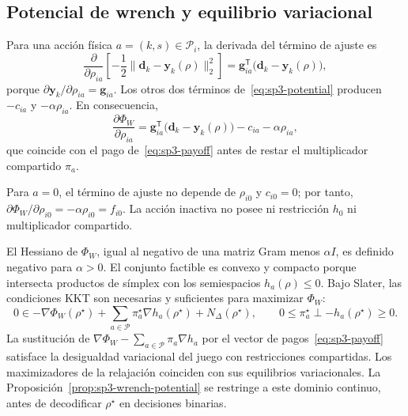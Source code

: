 \subsection{Potencial de wrench y equilibrio variacional}
\label{app:sp3-wrench-proof}

Para una acción física $a=(k,s)\in\mathcal P_i$, la derivada del término de ajuste es
\[
  \frac{\partial}{\partial\rho_{ia}}
  \left[-\frac12\|\boldsymbol d_k-\boldsymbol y_k(\rho)\|_2^2\right]
  =\boldsymbol g_{ia}^{\mathsf T}
   \bigl(\boldsymbol d_k-\boldsymbol y_k(\rho)\bigr),
\]
porque $\partial\boldsymbol y_k/\partial\rho_{ia}=\boldsymbol g_{ia}$. Los otros dos términos de~\eqref{eq:sp3-potential} producen $-c_{ia}$ y $-\alpha\rho_{ia}$. En consecuencia,
\[
  \frac{\partial\Phi_W}{\partial\rho_{ia}}
  =\boldsymbol g_{ia}^{\mathsf T}
   \bigl(\boldsymbol d_k-\boldsymbol y_k(\rho)\bigr)
   -c_{ia}-\alpha\rho_{ia},
\]
que coincide con el pago de~\eqref{eq:sp3-payoff} antes de restar el multiplicador compartido $\pi_a$.

Para $a=0$, el término de ajuste no depende de $\rho_{i0}$ y $c_{i0}=0$; por tanto, $\partial\Phi_W/\partial\rho_{i0}=-\alpha\rho_{i0}=f_{i0}$. La acción inactiva no posee ni restricción $h_0$ ni multiplicador compartido.

El Hessiano de $\Phi_W$, igual al negativo de una matriz Gram menos $\alpha I$, es definido negativo para $\alpha>0$. El conjunto factible es convexo y compacto porque intersecta productos de símplex con los semiespacios $h_a(\rho)\leq0$. Bajo Slater, las condiciones KKT son necesarias y suficientes para maximizar $\Phi_W$:
\[
  0\in-\nabla\Phi_W(\rho^\star)
  +\sum_{a\in\mathcal P}\pi_a^\star\nabla h_a(\rho^\star)
  +N_{\Delta}(\rho^\star),
  \qquad
  0\leq\pi_a^\star\perp-h_a(\rho^\star)\geq0.
\]
La sustitución de $\nabla\Phi_W-\sum_{a\in\mathcal P}\pi_a\nabla h_a$ por el vector de pagos~\eqref{eq:sp3-payoff} satisface la desigualdad variacional del juego con restricciones compartidas. Los maximizadores de la relajación coinciden con sus equilibrios variacionales. La Proposición~\ref{prop:sp3-wrench-potential} se restringe a este dominio continuo, antes de decodificar \(\rho^\star\) en decisiones binarias.
